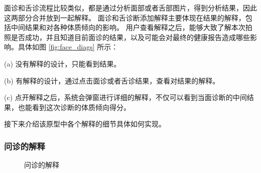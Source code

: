面诊和舌诊流程比较类似，都是通过分析面部或者舌部图片，得到分析结果，因此这两部分合并放到一起解释。
面诊和舌诊断添加解释主要体现在结果的解释，包括中间结果和对各种体质倾向的影响。
用户查看解释之后，能够大致了解本次拍照是否成功，并且知道目前面诊的结果，以及可能会对最终的健康报告造成哪些影响。具体如图 \ref{fig:face_diags} 所示：

(a) 没有解释的设计，只能看到结果。

(b) 有解释的设计，通过点击面诊或者舌诊结果，查看对结果的解释。

(c) 点开解释之后，系统会弹窗进行详细的解释，不仅可以看到当面诊断的中间结果，也能看到这次诊断的体质倾向得分。

接下来介绍该原型中各个解释的细节具体如何实现。


\subsubsection{问诊的解释}

\begin{figure}[htbp]
    \centering
    \caption{问诊的解释}
    \label{fig:questions}
\end{figure}

